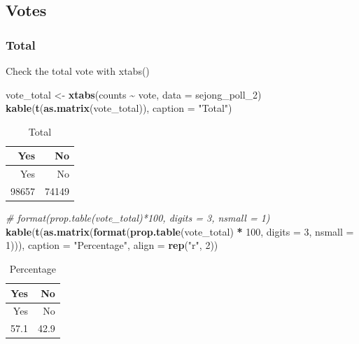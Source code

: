 \documentclass[
]{article}
\newenvironment{Shaded}{\begin{snugshade}}{\end{snugshade}}
\newcommand{\CommentTok}[1]{\textcolor[rgb]{0.56,0.35,0.01}{\textit{#1}}}
\newcommand{\DataTypeTok}[1]{\textcolor[rgb]{0.13,0.29,0.53}{#1}}
\newcommand{\DecValTok}[1]{\textcolor[rgb]{0.00,0.00,0.81}{#1}}
\newcommand{\KeywordTok}[1]{\textcolor[rgb]{0.13,0.29,0.53}{\textbf{#1}}}
\newcommand{\NormalTok}[1]{#1}
\newcommand{\OperatorTok}[1]{\textcolor[rgb]{0.81,0.36,0.00}{\textbf{#1}}}
\newcommand{\StringTok}[1]{\textcolor[rgb]{0.31,0.60,0.02}{#1}}
\begin{document}
\hypertarget{votes}{%
\subsection{Votes}\label{votes}}

\hypertarget{total}{%
\subsubsection{Total}\label{total}}

Check the total vote with xtabs()

\begin{Shaded}
\begin{Highlighting}[]
\NormalTok{vote\_total \textless{}{-}}\StringTok{ }\KeywordTok{xtabs}\NormalTok{(counts }\OperatorTok{\textasciitilde{}}\StringTok{ }\NormalTok{vote, }
                    \DataTypeTok{data =}\NormalTok{ sejong\_poll\_}\DecValTok{2}\NormalTok{)}
\KeywordTok{kable}\NormalTok{(}\KeywordTok{t}\NormalTok{(}\KeywordTok{as.matrix}\NormalTok{(vote\_total)), }
      \DataTypeTok{caption =} \StringTok{"Total"}\NormalTok{)}
\end{Highlighting}
\end{Shaded}

\begin{longtable}[]{@{}rr@{}}
\caption{Total}\tabularnewline
\toprule
Yes & No\tabularnewline
\midrule
\endfirsthead
\toprule
Yes & No\tabularnewline
\midrule
\endhead
98657 & 74149\tabularnewline
\bottomrule
\end{longtable}

\begin{Shaded}
\begin{Highlighting}[]
\CommentTok{\# format(prop.table(vote\_total)*100, digits = 3, nsmall = 1)}
\KeywordTok{kable}\NormalTok{(}\KeywordTok{t}\NormalTok{(}\KeywordTok{as.matrix}\NormalTok{(}\KeywordTok{format}\NormalTok{(}\KeywordTok{prop.table}\NormalTok{(vote\_total) }\OperatorTok{*}\StringTok{ }\DecValTok{100}\NormalTok{, }
                         \DataTypeTok{digits =} \DecValTok{3}\NormalTok{, }
                         \DataTypeTok{nsmall =} \DecValTok{1}\NormalTok{))), }
      \DataTypeTok{caption =} \StringTok{"Percentage"}\NormalTok{, }
      \DataTypeTok{align =} \KeywordTok{rep}\NormalTok{(}\StringTok{"r"}\NormalTok{, }\DecValTok{2}\NormalTok{))}
\end{Highlighting}
\end{Shaded}

\begin{longtable}[]{@{}rr@{}}
\caption{Percentage}\tabularnewline
\toprule
Yes & No\tabularnewline
\midrule
\endfirsthead
\toprule
Yes & No\tabularnewline
\midrule
\endhead
57.1 & 42.9\tabularnewline
\bottomrule
\end{longtable}
\end{document}
